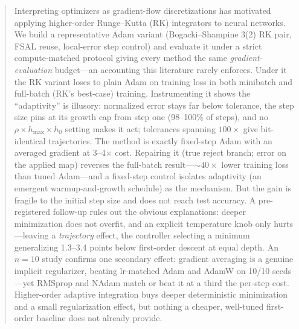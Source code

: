 \documentclass{article}
\newcommand{\hmax}{h_{\max}}
\begin{document}

\printAffiliationsAndNotice{}

\begin{abstract}
Interpreting optimizers as gradient-flow discretizations has motivated applying higher-order Runge--Kutta (RK) integrators to neural networks. We build a representative Adam variant (Bogacki--Shampine 3(2) RK pair, FSAL reuse, local-error step control) and evaluate it under a strict compute-matched protocol giving every method the same \emph{gradient-evaluation} budget---an accounting this literature rarely enforces. Under it the RK variant loses to plain Adam on training loss in both minibatch and full-batch (RK's best-case) training. Instrumenting it shows the ``adaptivity'' is illusory: normalized error stays far below tolerance, the step size pins at its growth cap from step one (98--100\% of steps), and no $\rho \times \hmax \times h_0$ setting makes it act; tolerances spanning $100\times$ give bit-identical trajectories. The method is exactly fixed-step Adam with an averaged gradient at 3--4$\times$ cost. Repairing it (true reject branch; error on the applied map) reverses the full-batch result---${\sim}40\times$ lower training loss than tuned Adam---and a fixed-step control isolates adaptivity (an emergent warmup-and-growth schedule) as the mechanism. But the gain is fragile to the initial step size and does not reach test accuracy. A pre-registered follow-up rules out the obvious explanations: deeper minimization does not overfit, and an explicit temperature knob only hurts---leaving a \emph{trajectory} effect, the controller selecting a minimum generalizing 1.3--3.4 points below first-order descent at equal depth. An $n{=}10$ study confirms one secondary effect: gradient averaging is a genuine implicit regularizer, beating lr-matched Adam and AdamW on 10/10 seeds---yet RMSprop and NAdam match or beat it at a third the per-step cost. Higher-order adaptive integration buys deeper deterministic minimization and a small regularization effect, but nothing a cheaper, well-tuned first-order baseline does not already provide.
\end{abstract}
\end{document}
